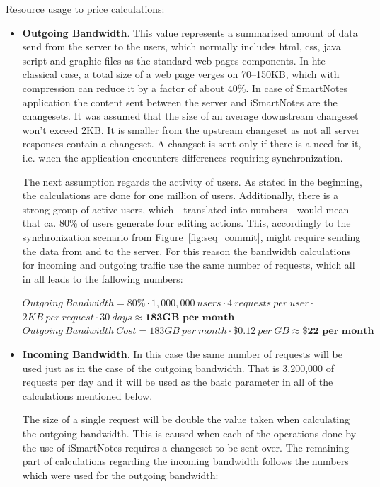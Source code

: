 Resource usage to price calculations:
\begin{itemize}
\item{\textbf{Outgoing Bandwidth}. This value represents a summarized amount of data send from the server to the users, which normally includes html, css, java script and graphic files as the standard web pages components. In hte classical case, a total size of a web page verges on \mbox{70--150KB}, which with compression can reduce it by a factor of about 40\%. In case of SmartNotes application the content sent between the server and iSmartNotes are the changesets. It was assumed that the size of an average downstream changeset won't exceed 2KB. It is smaller from the upstream changeset as not all server responses contain a changeset. A changset is sent only if there is a need for it, i.e. when the application encounters differences requiring synchronization.  
 
The next assumption regards the activity of users. As stated in the beginning, the calculations are done for one million of users. Additionally, there is a strong group of active users, which - translated into numbers - would mean that ca. 80\% of users generate four editing actions. This, accordingly to the synchronization scenario from Figure~\ref{fig:seq_commit}, might require sending the data from and to the server.  For this reason the bandwidth calculations for incoming and outgoing traffic use the same number of requests, which all in all leads to the fallowing numbers:
 
$Outgoing\ Bandwidth =  80\% \cdot 1,000,000\ users \cdot 4\ requests\ per\ user \cdot$\\ \hspace*{37mm} $2KB\ per\ request \cdot 30\ days \approx \textbf{183GB\ per\ month}$ \\
$Outgoing\ Bandwidth\ Cost = 183GB\ per\ month \cdot \$0.12\ per\ GB \approx \textbf{\$22 per\ month}$ }
 
\item{\textbf{Incoming Bandwidth}. In this case the same number of requests will be used just as in the case of the outgoing bandwidth. That is 3,200,000 of requests per day and it will be used as the basic parameter in all of the calculations mentioned below.
 
The size of a single request will be double the value taken when calculating the outgoing bandwidth. This is caused when each of the operations done by the use of iSmartNotes requires a changeset to be sent over. The remaining part of calculations regarding the incoming bandwidth follows the numbers which were used for the outgoing bandwidth:
 
}
\end{itemize}
